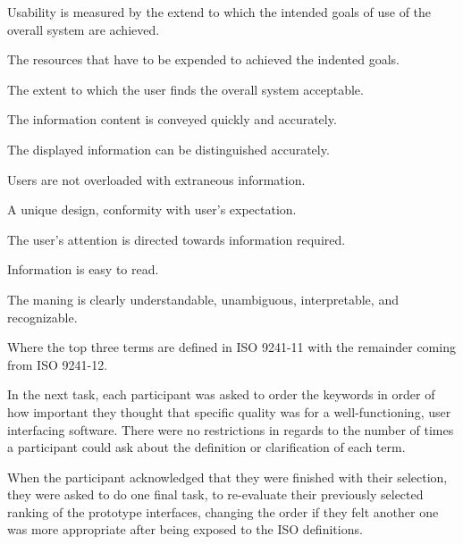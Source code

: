 {        \begin{description}[style=nextline]
          \item[Effectiveness]{
            Usability is measured by the extend to which the
            intended goals of use of the overall system are achieved.
          }
          \item[Efficiency]{
            The resources that have to be expended to achieved the indented
            goals.
          }
          \item[Satisfaction]{
            The extent to which the user finds the overall system
            acceptable.
          }
          \item[Clarity]{
              The information content is conveyed quickly and accurately.
          }
          \item[Discriminability]{
              The displayed information can be distinguished
              accurately.
          }
          \item[Conciseness]{
              Users are not overloaded with extraneous information.
          }
          \item[Consistency]{
              A unique design, conformity with user's expectation.
          }
          \item[Detectability]{
              The user's attention is directed towards information
              required.
          }
          \item[Legibility]{
              Information is easy to read.
          }
          \item[Comprehensibility]{
              The maning is clearly understandable, unambiguous,
              interpretable, and recognizable.
          }
        \end{description}

    Where the top three terms are defined in ISO 9241-11 with the remainder
    coming from ISO 9241-12.

    In the next task, each participant was asked to order the keywords
    in order of how important they thought that specific quality was for a
    well-functioning, user interfacing software. There were no restrictions
    in regards to the number of times a participant could ask about the
    definition or clarification of each term.

    When the participant acknowledged that they were finished with their
    selection, they were asked to do one final task, to re-evaluate their
    previously selected ranking of the prototype interfaces, changing the order
    if they felt another one was more appropriate after being exposed to the
    ISO definitions.

}

